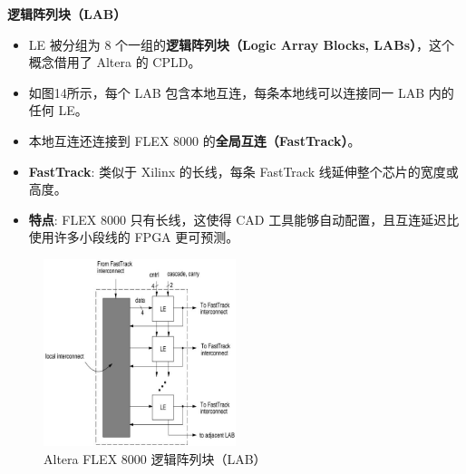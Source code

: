\begin{frame}[allowframebreaks]{\textbf{逻辑阵列块（LAB）}}
    \begin{itemize}
    \tightlist
    \item
    LE 被分组为 8 个一组的\textbf{逻辑阵列块（Logic Array Blocks,
    LABs）}，这个概念借用了 Altera 的 CPLD。
    \item
    如图14所示，每个 LAB 包含本地互连，每条本地线可以连接同一 LAB
    内的任何 LE。
    \item
    本地互连还连接到 FLEX 8000 的\textbf{全局互连（FastTrack）}。
    \item
    \textbf{FastTrack}: 类似于 Xilinx 的长线，每条 FastTrack
    线延伸整个芯片的宽度或高度。
    \item
    \textbf{特点}: FLEX 8000 只有长线，这使得 CAD
    工具能够自动配置，且互连延迟比使用许多小段线的 FPGA 更可预测。
    \end{itemize}

    \begin{figure}
        \centering
        \includegraphics[width=0.5\textwidth]{img1/FLEX800LAB.jpeg}
        \caption{Altera FLEX 8000 逻辑阵列块（LAB）}
    \end{figure}    

\end{frame}


